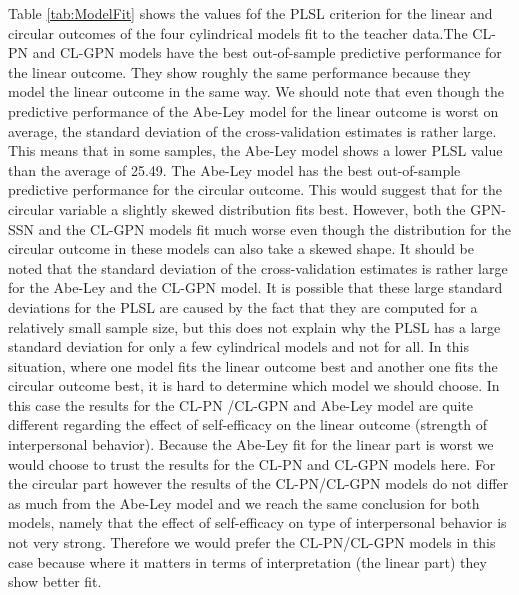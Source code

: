 \documentclass[man]{apa6}
\begin{document}
Table \ref{tab:ModelFit} shows the values fof the PLSL criterion for the linear
and circular outcomes of the four cylindrical models fit to the teacher
data.\newline \indent The CL-PN and CL-GPN models have the best out-of-sample
predictive performance for the linear outcome. They show roughly the same
performance because they model the linear outcome in the same way. We should
note that even though the predictive performance of the Abe-Ley model for the
linear outcome is worst on average, the standard deviation of the
cross-validation estimates is rather large. This means that in some samples, the
Abe-Ley model shows a lower PLSL value than the average of 25.49.\newline
\indent The Abe-Ley model has the best out-of-sample predictive performance for
the circular outcome. This would suggest that for the circular variable a
slightly skewed distribution fits best. However, both the GPN-SSN and the
CL-GPN models fit much worse even though the distribution for the circular
outcome in these models can also take a skewed shape. It should be noted that
the standard deviation of the cross-validation estimates is rather large for
the Abe-Ley and the CL-GPN model. It is possible that these large standard
deviations for the PLSL are caused by the fact that they are computed for a
relatively small sample size, but this does not explain why the PLSL has a large
standard deviation for only a few cylindrical models and not for all.\newline
\indent In this situation, where one model fits the linear outcome best and
another one fits the circular outcome best, it is hard to determine which model
we should choose. In this case the results for the CL-PN /CL-GPN and Abe-Ley
model are quite different regarding the effect of self-efficacy on the linear
outcome (strength of interpersonal behavior). Because the Abe-Ley fit for the
linear part is worst we would choose to trust the results for the CL-PN and
CL-GPN models here. For the circular part however the results of the CL-PN/CL-GPN
models do not differ as much from the Abe-Ley model and we reach the same
conclusion for both models, namely that the effect of self-efficacy on type of
interpersonal behavior is not very strong. Therefore we would prefer the
CL-PN/CL-GPN models in this case because where it matters in terms of
interpretation (the linear part) they show better fit.
\end{document}

